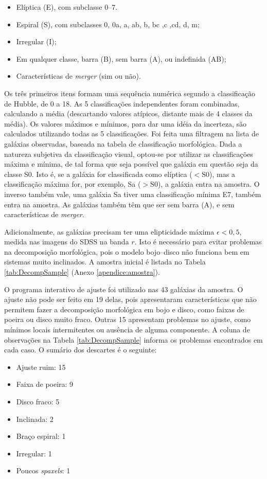 \begin{itemize}
  \item Elíptica (E), com subclasse 0--7.
  \item Espiral (S), com subclasses 0, 0a, a, ab, b, bc ,c ,cd, d, m;
  \item Irregular (I);
  \item Em qualquer classe, barra (B), sem barra (A), ou indefinida (AB);
  \item Características de {\em merger} (sim ou não).
\end{itemize}

Os três primeiros itens formam uma sequência numérica segundo a classificação de
Hubble, de 0 a 18. As 5 classificações independentes foram combinadas,
calculando a média (descartando valores atípicos, distante mais de 4 classes da
média). Os valores máximos e mínimos, para dar uma idéia da incerteza, são
calculados utilizando todas as 5 classificações. Foi feita uma filtragem na
lista de galáxias observadas, baseada na tabela de classificação morfológica.
Dada a natureza subjetiva da classificação visual, optou-se por utilizar as
classificações máxima e mínima, de tal forma que seja possível que galáxia em
questão seja da classe S0. Isto é, se a galáxia for classificada como elíptica
($<\mathrm{S0}$), mas a classificação máxima for, por exemplo, Sa
($>\mathrm{S0}$), a galáxia entra na amostra. O inverso também vale, uma galáxia
Sa tiver uma classificação mínima E7, também entra na amostra.
As galáxias também têm que ser sem barra (A), e sem características de {\em
merger}.

Adicionalmente, as galáxias precisam ter uma elipticidade máxima $\epsilon<0,5$,
medida nas imagens do SDSS na banda $r$. Isto é necessário para evitar problemas
na decomposição morfológica, pois o modelo bojo--disco não funciona bem em
sistemas muito inclinados. A amostra inicial é listada no Tabela
\ref{tab:DecompSample} (Anexo \ref{apendice:amostra}).

O programa interativo de ajuste foi utilizado nas 43 galáxias da amostra.
O ajuste não pode ser feito em 19 delas, pois apresentaram características que
não permitem fazer a decomposição morfológica em bojo e disco, como faixas de
poeira ou disco muito fraco. Outras 15 apresentam problemas no ajuste, como
mínimos locais intermitentes ou ausência de alguma componente. A coluna de
observações na Tabela \ref{tab:DecompSample} informa os problemas encontrados em
cada caso. O sumário dos descartes é o seguinte:

\begin{itemize}
  \item Ajuste ruim: 15
  \item Faixa de poeira: 9
  \item Disco fraco: 5
  \item Inclinada: 2
  \item Braço espiral: 1
  \item Irregular: 1
  \item Poucos {\em spaxels}: 1
\end{itemize}

